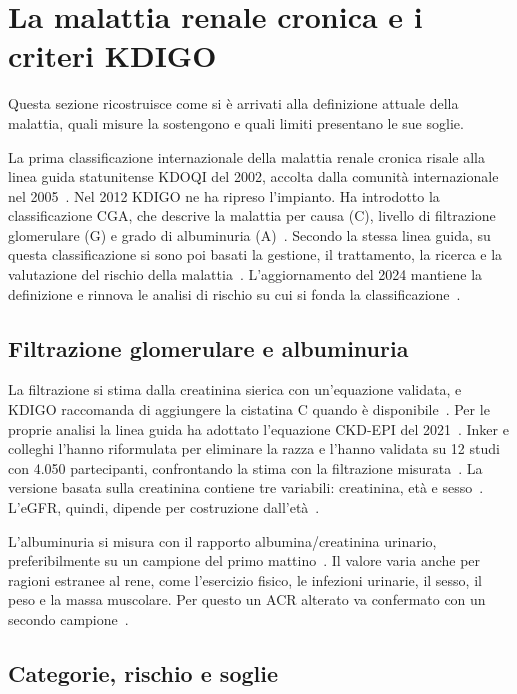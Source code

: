 \documentclass[a4paper, 12pt, oneside]{book}
\begin{document}
\section{La malattia renale cronica e i criteri KDIGO}

Questa sezione ricostruisce come si è arrivati alla definizione attuale della malattia, quali misure la sostengono e quali limiti presentano le sue soglie.

La prima classificazione internazionale della malattia renale cronica risale alla linea guida statunitense KDOQI del 2002, accolta dalla comunità internazionale nel 2005~\cite{stevens_kdigo_2024}. Nel 2012 KDIGO ne ha ripreso l'impianto. Ha introdotto la classificazione CGA, che descrive la malattia per causa (C), livello di filtrazione glomerulare (G) e grado di albuminuria (A)~\cite{stevens_kdigo_2024}. Secondo la stessa linea guida, su questa classificazione si sono poi basati la gestione, il trattamento, la ricerca e la valutazione del rischio della malattia~\cite{stevens_kdigo_2024}. L'aggiornamento del 2024 mantiene la definizione e rinnova le analisi di rischio su cui si fonda la classificazione~\cite{stevens_kdigo_2024}.

\subsection{Filtrazione glomerulare e albuminuria}

La filtrazione si stima dalla creatinina sierica con un'equazione validata, e KDIGO raccomanda di aggiungere la cistatina C quando è disponibile~\cite{stevens_kdigo_2024}. Per le proprie analisi la linea guida ha adottato l'equazione CKD-EPI del 2021~\cite{stevens_kdigo_2024}. Inker e colleghi l'hanno riformulata per eliminare la razza e l'hanno validata su 12 studi con 4.050 partecipanti, confrontando la stima con la filtrazione misurata~\cite{inker_new_2021}. La versione basata sulla creatinina contiene tre variabili: creatinina, età e sesso~\cite{stevens_kdigo_2024}. L'eGFR, quindi, dipende per costruzione dall'età~\cite{inker_new_2021}.

L'albuminuria si misura con il rapporto albumina/creatinina urinario, preferibilmente su un campione del primo mattino~\cite{stevens_kdigo_2024}. Il valore varia anche per ragioni estranee al rene, come l'esercizio fisico, le infezioni urinarie, il sesso, il peso e la massa muscolare. Per questo un ACR alterato va confermato con un secondo campione~\cite{stevens_kdigo_2024}.

\subsection{Categorie, rischio e soglie}
\end{document}

